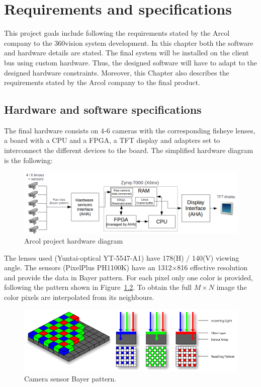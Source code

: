 \chapter{Requirements and specifications}\label{chapter:requirements}

This project goals include following the requirements stated by the Arcol company to the 360\degree vision system development. In this chapter both the software and hardware details are stated. The final system will be installed on the client bus using custom hardware. Thus, the designed software will have to adapt to the designed hardware constraints. Moreover, this Chapter also describes the requirements stated by the Arcol company to the final product.

\section{Hardware  and software specifications}
The final hardware consists on 4-6 cameras with the corresponding fisheye lenses, a board with a CPU and a FPGA, a TFT display and adapters set to interconnect the different devices to the board. The simplified hardware diagram is the following:

\begin{figure}[H]
\includegraphics[scale=0.6]{images/hardwareDigram}
\caption{Arcol project hardware diagram}
\label{fig:hardwareDiag}
\end{figure}

The lenses used (Yuntai-optical  YT-5547-A1) have  178\degree (H) / 140\degree (V) viewing angle. The sensors (PixelPlus PH1100K) have an 1312$\times$816 effective resolution and provide the data in Bayer pattern. For each pixel only one color is provided, following the pattern shown in Figure~\ref{fig:bayer}. To obtain the full $M\times N$ image the color pixels are interpolated from its neighbours.

\begin{figure}
\center
\includegraphics[scale=0.4]{images/bayer}
\caption{Camera sensor Bayer pattern. \cite{siliconimaging}}
\label{fig:bayer}
\end{figure}

